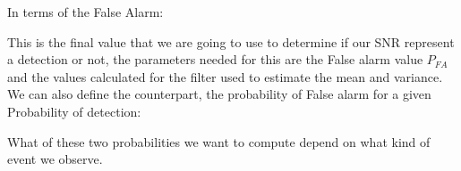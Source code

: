 
\newp In terms of the False Alarm:


\newp This is the final value that we are going to use to determine if our SNR represent a detection or not, the parameters needed for this are the False alarm value $P_{FA}$ and the values calculated for the filter used to estimate the mean and variance. We can also define the counterpart, the probability of False alarm for a given Probability of detection:


\newp What of these two probabilities we want to compute depend on what kind of event we observe.




\newpage
\nocite{*}
%
%
\begin{multicols}{2}[\printbibheading]
\printbibliography[heading=none]
\end{multicols}
